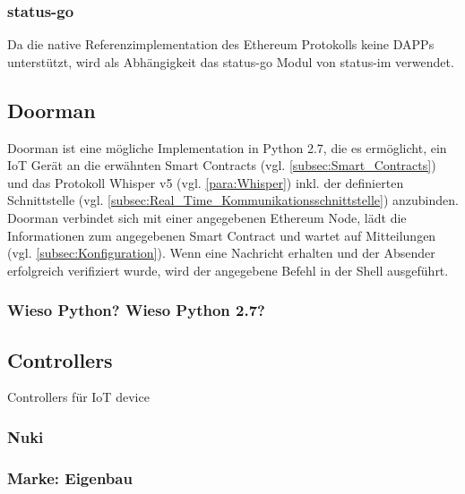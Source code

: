\subsubsection{status-go}
Da die native Referenzimplementation des Ethereum Protokolls keine \acrshort{DAPPs} unterstützt, wird als Abhängigkeit das status-go Modul von status-im verwendet.\cite{go-ethereum,status.im,github.com/status-im/status-go}


\subsection{Doorman}
\label{subsec:Doorman}
Doorman ist eine mögliche Implementation in Python 2.7, die es ermöglicht, ein IoT Gerät an die erwähnten Smart Contracts (vgl. \ref{subsec:Smart_Contracts}) und das Protokoll Whisper v5 (vgl. \ref{para:Whisper}) inkl. der definierten Schnittstelle (vgl. \ref{subsec:Real_Time_Kommunikationsschnittstelle}) anzubinden. Doorman verbindet sich mit einer angegebenen Ethereum Node, lädt die Informationen zum angegebenen Smart Contract und wartet auf Mitteilungen (vgl. \ref{subsec:Konfiguration}). Wenn eine Nachricht erhalten und der Absender erfolgreich verifiziert wurde, wird der angegebene Befehl in der Shell ausgeführt.

\subsubsection{Wieso Python? Wieso Python 2.7?}

\subsection{Controllers}
Controllers für IoT device
\subsubsection{Nuki}

\subsubsection{Marke: Eigenbau}

